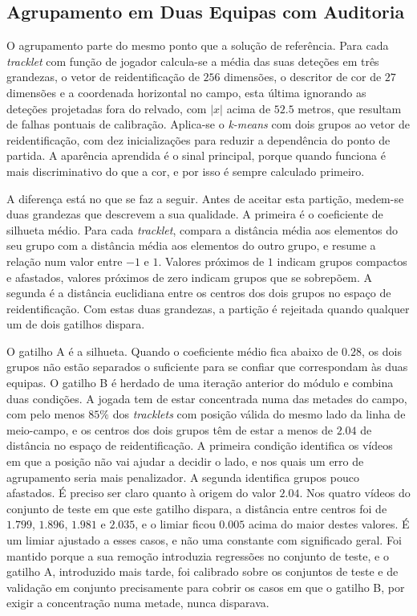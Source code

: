 \subsection{Agrupamento em Duas Equipas com Auditoria}\label{sec:agrupamento}

O agrupamento parte do mesmo ponto que a solução de referência. Para cada \emph{tracklet} com
função de jogador calcula-se a média das suas deteções em três grandezas, o vetor de
reidentificação de $256$ dimensões, o descritor de cor de $27$ dimensões e a coordenada
horizontal no campo, esta última ignorando as deteções projetadas fora do relvado, com $|x|$ acima
de $52.5$ metros, que resultam de falhas pontuais de calibração. Aplica-se o \emph{k-means} com
dois grupos ao vetor de reidentificação, com dez inicializações para reduzir a dependência do
ponto de partida. A aparência aprendida é o sinal principal, porque quando funciona é mais
discriminativo do que a cor, e por isso é sempre calculado primeiro.

A diferença está no que se faz a seguir. Antes de aceitar esta partição, medem-se duas grandezas
que descrevem a sua qualidade. A primeira é o coeficiente de silhueta médio. Para cada
\emph{tracklet}, compara a distância média aos elementos do seu grupo com a distância média aos
elementos do outro grupo, e resume a relação num valor entre $-1$ e $1$. Valores próximos de $1$
indicam grupos compactos e afastados, valores próximos de zero indicam grupos que se sobrepõem. A
segunda é a distância euclidiana entre os centros dos dois grupos no espaço de reidentificação.
Com estas duas grandezas, a partição é rejeitada quando qualquer um de dois gatilhos dispara.

O gatilho A é a silhueta. Quando o coeficiente médio fica abaixo de $0.28$, os dois grupos não
estão separados o suficiente para se confiar que correspondam às duas equipas. O gatilho B é
herdado de uma iteração anterior do módulo e combina duas condições. A jogada tem de estar
concentrada numa das metades do campo, com pelo menos $85\%$ dos \emph{tracklets} com posição
válida do mesmo lado da linha de meio-campo, e os centros dos dois grupos têm de estar a menos de
$2.04$ de distância no espaço de reidentificação. A primeira condição identifica os vídeos em que
a posição não vai ajudar a decidir o lado, e nos quais um erro de agrupamento seria mais
penalizador. A segunda identifica grupos pouco afastados. É preciso ser claro quanto à origem do
valor $2.04$. Nos quatro vídeos do conjunto de teste em que este gatilho dispara, a distância
entre centros foi de $1.799$, $1.896$, $1.981$ e $2.035$, e o limiar ficou $0.005$ acima do maior
destes valores. É um limiar ajustado a esses casos, e não uma constante com significado
geral. Foi mantido porque a sua remoção introduzia regressões no conjunto de teste, e o gatilho A,
introduzido mais tarde, foi calibrado sobre os conjuntos de teste e de validação em conjunto
precisamente para cobrir os casos em que o gatilho B, por exigir a concentração numa metade, nunca
disparava.

